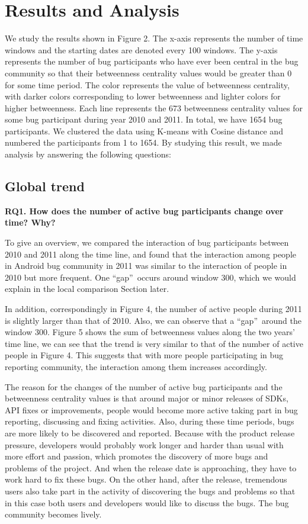 \documentclass[10pt, conference, compsocconf]{IEEEtran}
\begin{document}
\section{Results and Analysis}
\label{results}
We study the results shown in Figure 2. The x-axis represents the number of time windows and the starting dates are denoted every 100 windows. The y-axis represents the number of bug participants who have ever been central in the bug community so that their betweenness centrality values would be greater than 0 for some time period. The color represents the value of betweenness centrality, with darker colors corresponding to lower betweenness and lighter colors for higher betweenness. Each line represents the 673 betweenness centrality values for some bug participant during year 2010 and 2011. In total, we have 1654 bug participants. We clustered the data using K-means with Cosine distance and numbered the participants from 1 to 1654. By studying this result, we made analysis by answering the following questions:

\subsection{Global trend}

\textbf{RQ1. How does the number of active bug participants change over time? Why?}

To give an overview, we compared the interaction of bug participants between 2010 and 2011 along the time line, and found that the interaction among people in Android bug community in 2011 was similar to the interaction of people in 2010 but more frequent. One  \textquotedblleft gap\textquotedblright \ occurs around window 300, which we would explain in the local comparison Section later. 

In addition, correspondingly in Figure 4, the number of active people during 2011 is slightly larger than that of 2010. Also, we can observe that a \textquotedblleft gap\textquotedblright \ around the window 300. Figure 5 shows the sum of betweenness values along the two years' time line, we can see that the trend is very similar to that of the number of active people in Figure 4. This suggests that with more people participating in bug reporting community, the interaction among them increases accordingly.

The reason for the changes of the number of active bug participants and the betweenness centrality values is that around major or minor releases of SDKs, API fixes or improvements, people would become more active taking part in bug reporting, discussing and fixing activities. Also, during these time periods, bugs are more likely to be discovered and reported. Because with the product release pressure, developers would probably work longer and harder than usual with more effort and passion, which promotes the discovery of more bugs and problems of the project. And when the release date is approaching, they have to work hard to fix these bugs. On the other hand, after the release, tremendous users also take part in the activity of discovering the bugs and problems so that in this case both users and developers would like to discuss the bugs. The bug community becomes lively. 
\end{document}
